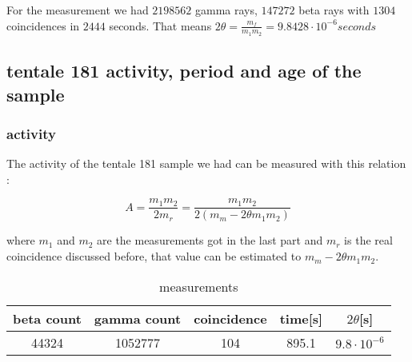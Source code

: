 \documentclass[a4paper,12pt,oneside]{article}
\def \be {\begin{equation}}
\def \ee {\end{equation}}
\begin{document}

For the measurement we had $2198562$ gamma rays, $147272$ beta rays with $1304$ coincidences in $2444$ seconds.
That means
$2\theta=\frac{m_f}{m_1m_2}                                                      = 9.8428\cdot10^{-6} seconds$










\subsection{tentale 181 activity, period and age of the sample}


\subsubsection{activity}


	The activity of the tentale 181 sample we had can be measured with this relation :

	\be
		A = \frac{m_1 m_2}{2 m_r} = \frac{m_1 m_2}{2(m_m - 2\theta m_1 m_2)}
	\ee

	where $m_1$ and $m_2$ are the measurements got in the last part and $m_r$ is the real coincidence discussed before, that value can be estimated to $m_m - 2\theta m_1 m_2$.


	\begin{table}[h!]
	\centering
		\begin{tabular}{|c|c|c|c|c|}
			\hline
				beta count	&gamma count	&coincidence	&time[s] 	&$2\theta$[s]\\
			\hline
				44324		&1052777		&104			&895.1		&$9.8\cdot10^{-6}$\\
			\hline
		\end{tabular}
		\caption{measurements}
		\label{tab:poisson}
	\end{table}
\end{document}
